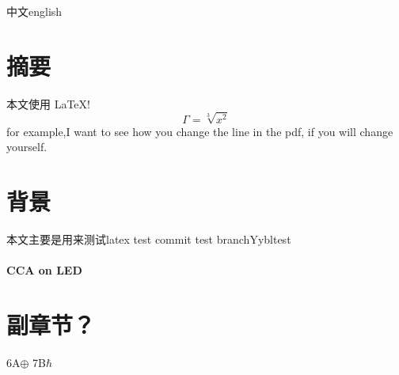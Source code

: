 \documentclass{article}
\begin{document}
	中文english
	\section{摘要}
	本文使用 \LaTeX!  $$ \Gamma=\sqrt[3]{x^2} $$
	for example,I want to see how you change the line in the pdf, if you will change yourself.
	\section{背景}
	本文主要是用来测试latex
	test commit
	test branchYybltest
	\paragraph{CCA on LED}\section*{副章节？}
	6A$\oplus$ 7B$\hbar$
\end{document}
